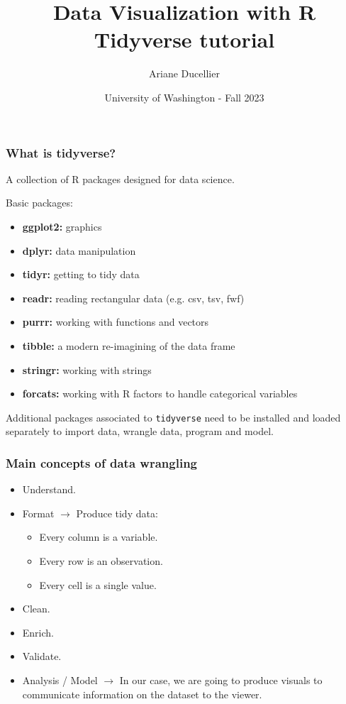 \documentclass{beamer}
\title[Data Visualization with R - Tidyverse tutorial]{Data Visualization with R \\ Tidyverse tutorial}
\author{Ariane Ducellier}
\date{University of Washington - Fall 2023}
\begin{document}
	\begin{frame}
		\titlepage
	\end{frame}

	\begin{frame}[fragile]
		\frametitle{What is tidyverse?}

		A collection of R packages designed for data science.

		\vspace{1em}

		Basic packages:
		\begin{itemize}
			\item \textbf{ggplot2:} graphics
			\item \textbf{dplyr:} data manipulation
			\item \textbf{tidyr:} getting to tidy data
			\item \textbf{readr:} reading rectangular data (e.g. csv, tsv, fwf)
			\item \textbf{purrr:} working with functions and vectors
			\item \textbf{tibble:} a modern re-imagining of the data frame
			\item \textbf{stringr:} working with strings
			\item \textbf{forcats:} working with R factors to handle categorical variables
		\end{itemize}

		\vspace{1em}

		Additional packages associated to \verb|tidyverse| need to be installed and loaded separately to import data, wrangle data, program and model.		
		
	\end{frame}

	\begin{frame}
		\frametitle{Main concepts of data wrangling}

		\begin{itemize}
		\setlength{\itemsep}{1em}
			\item Understand.
			\item Format $\rightarrow$ Produce tidy data:
			\begin{itemize}
				\item Every column is a variable.
				\item Every row is an observation.
				\item Every cell is a single value.
			\end{itemize}
			\item Clean.
			\item Enrich.
			\item Validate.
			\item Analysis / Model $\rightarrow$ In our case, we are going to produce visuals to communicate information on the dataset to the viewer.
		\end{itemize}

	\end{frame}
\end{document}
